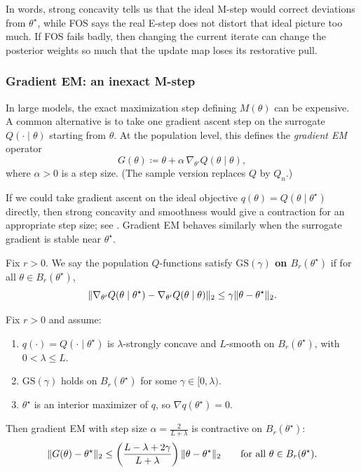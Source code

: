 \documentclass[11pt]{article}
\begin{document}
In words, strong concavity tells us that the ideal M-step would correct deviations from $\theta^\star$, while FOS says the real E-step does not distort that ideal picture too much.
If FOS fails badly, then changing the current iterate can change the posterior weights so much that the update map loses its restorative pull.

\subsubsection{Gradient EM: an inexact M-step}
\label{subsec:em-gradient-em}

In large models, the exact maximization step defining $M(\theta)$ can be expensive.
A common alternative is to take one gradient ascent step on the surrogate $Q(\cdot\mid\theta)$ starting from $\theta$.
At the population level, this defines the \emph{gradient EM} operator
\[
G(\theta)\coloneqq \theta + \alpha\,\nabla_{\theta'} Q(\theta\mid\theta),
\]
where $\alpha>0$ is a step size.
(The sample version replaces $Q$ by $Q_n$.)

If we could take gradient ascent on the ideal objective $q(\theta)=Q(\theta\mid\theta^\star)$ directly, then strong concavity and smoothness would give a contraction for an appropriate step size; see \citep[\S9.2]{boyd_vandenberghe_2004_convex}.
Gradient EM behaves similarly when the surrogate gradient is stable near $\theta^\star$.

\begin{definition}
\label{def:em-gs}
Fix $r>0$.
We say the population $Q$-functions satisfy \textbf{$\mathrm{GS}(\gamma)$ on $B_r(\theta^\star)$} if for all $\theta\in B_r(\theta^\star)$,
\[
\lVert\nabla_{\theta'} Q(\theta\mid \theta^\star)-\nabla_{\theta'} Q(\theta\mid \theta)\rVert_2
\le
\gamma \lVert\theta-\theta^\star\rVert_2.
\]
\end{definition}

\begin{theorem}
\label{thm:em-gs-implies-contraction}
Fix $r>0$ and assume:
\begin{enumerate}[leftmargin=*]
  \item $q(\cdot)=Q(\cdot\mid\theta^\star)$ is $\lambda$-strongly concave and $L$-smooth on $B_r(\theta^\star)$, with $0<\lambda\le L$.
  \item $\mathrm{GS}(\gamma)$ holds on $B_r(\theta^\star)$ for some $\gamma\in[0,\lambda)$.
  \item $\theta^\star$ is an interior maximizer of $q$, so $\nabla q(\theta^\star)=0$.
\end{enumerate}
Then gradient EM with step size $\alpha=\frac{2}{L+\lambda}$ is contractive on $B_r(\theta^\star)$:
\[
\lVert G(\theta)-\theta^\star\rVert_2
\le
\left(\frac{L-\lambda+2\gamma}{L+\lambda}\right)\lVert\theta-\theta^\star\rVert_2
\qquad\text{for all }\theta\in B_r(\theta^\star).
\]
\end{theorem}
\end{document}
